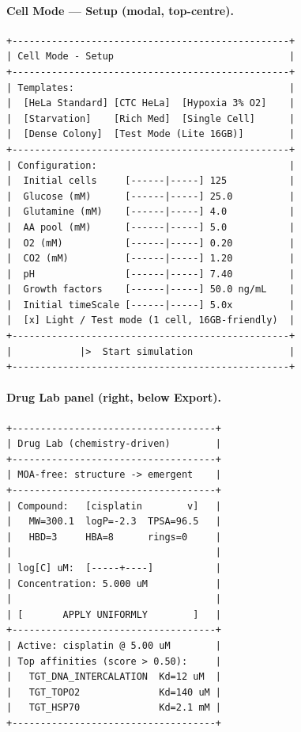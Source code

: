 \documentclass[11pt,letterpaper,twoside,openany]{book}
\begin{document}
\paragraph{Cell Mode --- Setup (modal, top-centre).}
\begin{verbatim}
+-------------------------------------------------+
| Cell Mode - Setup                               |
+-------------------------------------------------+
| Templates:                                      |
|  [HeLa Standard] [CTC HeLa]  [Hypoxia 3% O2]    |
|  [Starvation]    [Rich Med]  [Single Cell]      |
|  [Dense Colony]  [Test Mode (Lite 16GB)]        |
+-------------------------------------------------+
| Configuration:                                  |
|  Initial cells     [------|-----] 125           |
|  Glucose (mM)      [------|-----] 25.0          |
|  Glutamine (mM)    [------|-----] 4.0           |
|  AA pool (mM)      [------|-----] 5.0           |
|  O2 (mM)           [------|-----] 0.20          |
|  CO2 (mM)          [------|-----] 1.20          |
|  pH                [------|-----] 7.40          |
|  Growth factors    [------|-----] 50.0 ng/mL    |
|  Initial timeScale [------|-----] 5.0x          |
|  [x] Light / Test mode (1 cell, 16GB-friendly)  |
+-------------------------------------------------+
|            |>  Start simulation                 |
+-------------------------------------------------+
\end{verbatim}

\paragraph{Drug Lab panel (right, below Export).}
\begin{verbatim}
+------------------------------------+
| Drug Lab (chemistry-driven)        |
+------------------------------------+
| MOA-free: structure -> emergent    |
+------------------------------------+
| Compound:   [cisplatin        v]   |
|   MW=300.1  logP=-2.3  TPSA=96.5   |
|   HBD=3     HBA=8      rings=0     |
|                                    |
| log[C] uM:  [-----+----]           |
| Concentration: 5.000 uM            |
|                                    |
| [       APPLY UNIFORMLY        ]   |
+------------------------------------+
| Active: cisplatin @ 5.00 uM        |
| Top affinities (score > 0.50):     |
|   TGT_DNA_INTERCALATION  Kd=12 uM  |
|   TGT_TOPO2              Kd=140 uM |
|   TGT_HSP70              Kd=2.1 mM |
+------------------------------------+
\end{verbatim}
\end{document}
